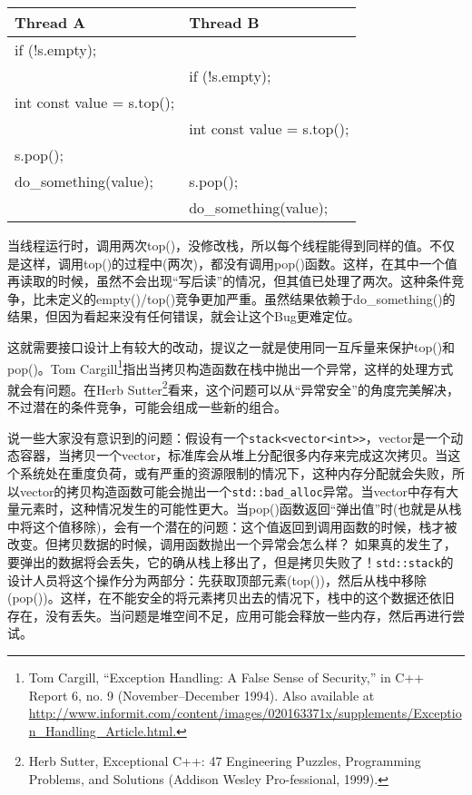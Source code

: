 \begin{table}[htbp]
    \begin{tabular}{|l|l|}
    \hline
    Thread A                   & Thread B                   \\ \hline
    if (!s.empty);             &                            \\ \hline
                               & if (!s.empty);             \\ \hline
    int const value = s.top(); &                            \\ \hline
                               & int const value = s.top(); \\ \hline
    s.pop();                   &                            \\ \hline
    do\_something(value);      & s.pop();                   \\ \hline
                               & do\_something(value);      \\ \hline
    \end{tabular}
    \end{table}


当线程运行时，调用两次top()，没修改栈，所以每个线程能得到同样的值。不仅是这样，调用top()的过程中(两次)，都没有调用pop()函数。这样，在其中一个值再读取的时候，虽然不会出现“写后读”的情况，但其值已处理了两次。这种条件竞争，比未定义的empty()/top()竞争更加严重。虽然结果依赖于do\_something()的结果，但因为看起来没有任何错误，就会让这个Bug更难定位。

这就需要接口设计上有较大的改动，提议之一就是使用同一互斥量来保护top()和pop()。Tom Cargill\footnote[1]{Tom Cargill, “Exception Handling: A False Sense of Security,” in C++ Report 6, no. 9 (November–December 1994). Also available at \url{http://www.informit.com/content/images/020163371x/supplements/Exception_Handling_Article.html.}}指出当拷贝构造函数在栈中抛出一个异常，这样的处理方式就会有问题。在Herb Sutter\footnote[2]{Herb Sutter, Exceptional C++: 47 Engineering Puzzles, Programming Problems, and Solutions (Addison Wesley Pro-fessional, 1999).}看来，这个问题可以从“异常安全”的角度完美解决，不过潜在的条件竞争，可能会组成一些新的组合。

说一些大家没有意识到的问题：假设有一个\texttt{stack<vector<int>>}，vector是一个动态容器，当拷贝一个vector，标准库会从堆上分配很多内存来完成这次拷贝。当这个系统处在重度负荷，或有严重的资源限制的情况下，这种内存分配就会失败，所以vector的拷贝构造函数可能会抛出一个\texttt{std::bad\_alloc}异常。当vector中存有大量元素时，这种情况发生的可能性更大。当pop()函数返回“弹出值”时(也就是从栈中将这个值移除)，会有一个潜在的问题：这个值返回到调用函数的时候，栈才被改变。但拷贝数据的时候，调用函数抛出一个异常会怎么样？ 如果真的发生了，要弹出的数据将会丢失，它的确从栈上移出了，但是拷贝失败了！\texttt{std::stack}的设计人员将这个操作分为两部分：先获取顶部元素(top())，然后从栈中移除(pop())。这样，在不能安全的将元素拷贝出去的情况下，栈中的这个数据还依旧存在，没有丢失。当问题是堆空间不足，应用可能会释放一些内存，然后再进行尝试。

